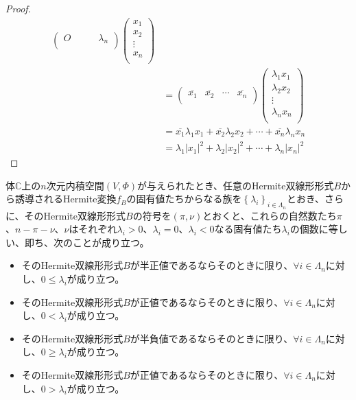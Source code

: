 \documentclass[dvipdfmx]{jsarticle}
\begin{document}
\begin{proof}
\begin{align*}
\begin{pmatrix}
O & \  & \  & \lambda_{n} \\
\end{pmatrix}\begin{pmatrix}
x_{1} \\
x_{2} \\
 \vdots \\
x_{n} \\
\end{pmatrix}\\
&= \begin{pmatrix}
\overline{x_{1}} & \overline{x_{2}} & \cdots & \overline{x_{n}} \\
\end{pmatrix}\begin{pmatrix}
\lambda_{1}x_{1} \\
\lambda_{2}x_{2} \\
 \vdots \\
\lambda_{n}x_{n} \\
\end{pmatrix}\\
&= \overline{x_{1}}\lambda_{1}x_{1} + \overline{x_{2}}\lambda_{2}x_{2} + \cdots + \overline{x_{n}}\lambda_{n}x_{n}\\
&= \lambda_{1}\left| x_{1} \right|^{2} + \lambda_{2}\left| x_{2} \right|^{2} + \cdots + \lambda_{n}\left| x_{n} \right|^{2}
\end{align*}
\end{proof}
\begin{thm}\label{2.3.10.4s}
体$\mathbb{C}$上の$n$次元内積空間$(V,\varPhi)$が与えられたとき、任意のHermite双線形形式$B$から誘導されるHermite変換$f_{B}$の固有値たちからなる族を$\left\{ \lambda_{i} \right\}_{i \in \varLambda_{n}}$とおき、さらに、そのHermite双線形形式$B$の符号を$(\pi,\nu)$とおくと、これらの自然数たち$\pi$、$n - \pi - \nu$、$\nu$はそれぞれ$\lambda_{i} > 0$、$\lambda_{i} = 0$、$\lambda_{i} < 0$なる固有値たち$\lambda_{i}$の個数に等しい、即ち、次のことが成り立つ。
\begin{itemize}
\item
  そのHermite双線形形式$B$が半正値であるならそのときに限り、$\forall i \in \varLambda_{n}$に対し、$0 \leq \lambda_{i}$が成り立つ。
\item
  そのHermite双線形形式$B$が正値であるならそのときに限り、$\forall i \in \varLambda_{n}$に対し、$0 < \lambda_{i}$が成り立つ。
\item
  そのHermite双線形形式$B$が半負値であるならそのときに限り、$\forall i \in \varLambda_{n}$に対し、$0 \geq \lambda_{i}$が成り立つ。
\item
  そのHermite双線形形式$B$が正値であるならそのときに限り、$\forall i \in \varLambda_{n}$に対し、$0 > \lambda_{i}$が成り立つ。
\end{itemize}
\end{thm}
\end{document}
